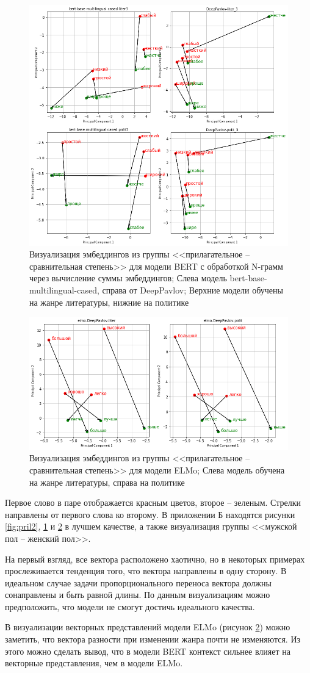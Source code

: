 \documentclass[a4paper,14pt]{article}
\begin{document}
\begin{figure}[H]
	\centering
	\includegraphics[width=0.47\linewidth]{image/pril_3}
	\caption{Визуализация эмбеддингов из группы <<прилагательное -- сравнительная степень>> для модели BERT с обработкой N-грамм через вычисление суммы эмбеддингов; Слева модель bert-base-multilingual-cased, справа от DeepPavlov; Верхние модели обучены на жанре литературы, нижние на политике}
	\label{fig:pril3}
\end{figure}

\begin{figure}[H]
	\centering
	\includegraphics[width=0.47\linewidth]{image/elmo_pil}
	\caption{Визуализация эмбеддингов из группы <<прилагательное -- сравнительная степень>> для модели ELMo; Слева модель обучена на жанре литературы, справа на политике}
	\label{fig:elmopil}
\end{figure}

Первое слово в паре отображается красным цветов, второе -- зеленым.
Стрелки направлены от первого слова ко второму.
В приложении Б находятся рисунки \ref{fig:pril2}, \ref{fig:pril3} и \ref{fig:elmopil} в лучшем качестве, а также визуализация группы <<мужской пол -- женский пол>>.
 
На первый взгляд, все вектора расположено хаотично, но в некоторых примерах прослеживается тенденция того, что вектора направлены в одну сторону.
В идеальном случае задачи пропорционального переноса вектора должны сонаправлены и быть равной длины.
По данным визуализациям можно предположить, что модели не смогут достичь идеального качества.

В визуализации векторных представлений модели ELMo (рисунок \ref{fig:elmopil}) можно заметить, что вектора разности при изменении жанра почти не изменяются.
Из этого можно сделать вывод, что в модели BERT контекст сильнее влияет на векторные представления, чем в модели ELMo.
\end{document}
